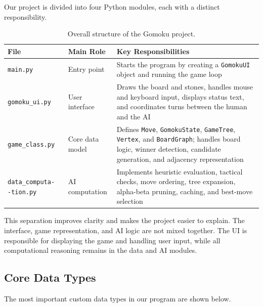 \documentclass[11pt]{article}
\begin{document}
Our project is divided into four Python modules, each with a distinct responsibility.

\begin{table}[H]
\centering
\small
\begin{tabularx}{\textwidth}{|P{2.5cm}|P{2.3cm}|Y|}
\hline
\textbf{File} & \textbf{Main Role} & \textbf{Key Responsibilities} \\
\hline
\texttt{main.py} & Entry point & Starts the program by creating a \texttt{GomokuUI} object and running the game loop \\
\hline
\texttt{gomoku\_ui.py} & User interface & Draws the board and stones, handles mouse and keyboard input, displays status text, and coordinates turns between the human and the AI \\
\hline
\texttt{game\_class.py} & Core data model & Defines \texttt{Move}, \texttt{GomokuState}, \texttt{GameTree}, \texttt{Vertex}, and \texttt{BoardGraph}; handles board logic, winner detection, candidate generation, and adjacency representation \\
\hline
\texttt{data\_computa-
-tion.py} & AI computation & Implements heuristic evaluation, tactical checks, move ordering, tree expansion, alpha-beta pruning, caching, and best-move selection \\
\hline
\end{tabularx}
\caption{Overall structure of the Gomoku project.}
\end{table}

This separation improves clarity and makes the project easier to explain. The interface, game representation, and AI logic are not mixed together. The UI is responsible for displaying the game and handling user input, while all computational reasoning remains in the data and AI modules.

\subsection*{Core Data Types}

The most important custom data types in our program are shown below.
\end{document}
